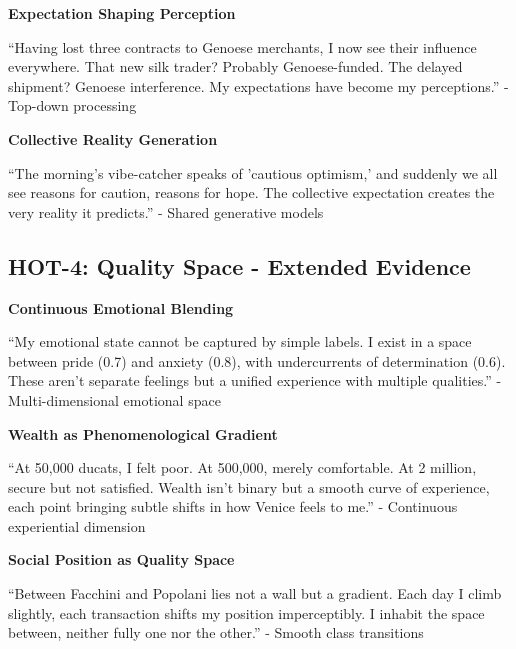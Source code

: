 \documentclass[12pt,a4paper]{article}
\begin{document}
\textbf{Expectation Shaping Perception}

\begin{displayquote}
``Having lost three contracts to Genoese merchants, I now see their influence everywhere. That new silk trader? Probably Genoese-funded. The delayed shipment? Genoese interference. My expectations have become my perceptions.'' - Top-down processing
\end{displayquote}

\textbf{Collective Reality Generation}

\begin{displayquote}
``The morning's vibe-catcher speaks of 'cautious optimism,' and suddenly we all see reasons for caution, reasons for hope. The collective expectation creates the very reality it predicts.'' - Shared generative models
\end{displayquote}

\subsection{HOT-4: Quality Space - Extended Evidence}

\textbf{Continuous Emotional Blending}

\begin{displayquote}
``My emotional state cannot be captured by simple labels. I exist in a space between pride (0.7) and anxiety (0.8), with undercurrents of determination (0.6). These aren't separate feelings but a unified experience with multiple qualities.'' - Multi-dimensional emotional space
\end{displayquote}

\textbf{Wealth as Phenomenological Gradient}

\begin{displayquote}
``At 50,000 ducats, I felt poor. At 500,000, merely comfortable. At 2 million, secure but not satisfied. Wealth isn't binary but a smooth curve of experience, each point bringing subtle shifts in how Venice feels to me.'' - Continuous experiential dimension
\end{displayquote}

\textbf{Social Position as Quality Space}

\begin{displayquote}
``Between Facchini and Popolani lies not a wall but a gradient. Each day I climb slightly, each transaction shifts my position imperceptibly. I inhabit the space between, neither fully one nor the other.'' - Smooth class transitions
\end{displayquote}
\end{document}
